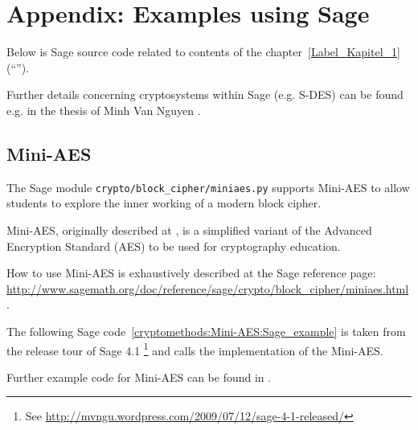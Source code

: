 	

\newpage
\hypertarget{CM_Appendix_SageCode}{}
\section{Appendix: Examples using Sage}
\label{CM_Sage_samples}

\noindent Below is Sage source code related to contents of the
chapter~\ref{Label_Kapitel_1} (``''). 

Further details concerning cryptosystems within Sage (e.g. S-DES) can be
found e.g. in the thesis of Minh Van Nguyen \cite{cm:Nguyen2009}.

\subsection{Mini-AES}
\label{CM_Sage_Mini-AES}

The Sage module \texttt{crypto/block\_cipher/miniaes.py} supports Mini-AES to allow
students to explore the inner working of a modern block cipher.

Mini-AES, originally described at \cite{cm:Phan2002}, is a simplified variant of the
Advanced Encryption Standard (AES) to be used for cryptography education.

How to use Mini-AES is exhaustively described at the Sage reference page:\\
\url{http://www.sagemath.org/doc/reference/sage/crypto/block_cipher/miniaes.html}.

The following Sage code~\ref{cryptomethods:Mini-AES:Sage_example}
is taken from the release tour of Sage 4.1%
\footnote{
See \url{http://mvngu.wordpress.com/2009/07/12/sage-4-1-released/}
}
and calls the implementation of the Mini-AES.

Further example code for Mini-AES can be found in \cite[chap. 6.5 and appendix D]{cm:Nguyen2009}.

